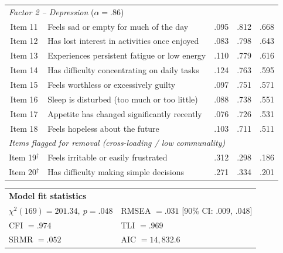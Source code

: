 \documentclass[12pt, a4paper]{article}
\begin{document}
\begin{table}[ht]
\begin{tabular}{clccc}
\multicolumn{5}{l}{\textit{Factor 2 -- Depression} ($\alpha = .86$)} \\[3pt]
\rowcolor{factor2col} Item 11 & Feels sad or empty for much of the day         & .095 & .812 & .668 \\
\rowcolor{factor2col} Item 12 & Has lost interest in activities once enjoyed   & .083 & .798 & .643 \\
\rowcolor{factor2col} Item 13 & Experiences persistent fatigue or low energy   & .110 & .779 & .616 \\
\rowcolor{factor2col} Item 14 & Has difficulty concentrating on daily tasks    & .124 & .763 & .595 \\
\rowcolor{factor2col} Item 15 & Feels worthless or excessively guilty          & .097 & .751 & .571 \\
\rowcolor{factor2col} Item 16 & Sleep is disturbed (too much or too little)    & .088 & .738 & .551 \\
\rowcolor{factor2col} Item 17 & Appetite has changed significantly recently    & .076 & .726 & .531 \\
\rowcolor{factor2col} Item 18 & Feels hopeless about the future                & .103 & .711 & .511 \\[6pt]

\multicolumn{5}{l}{\textit{Items flagged for removal (cross-loading / low communality)}} \\[3pt]
\rowcolor{poorload} Item 19$^{\dagger}$ & Feels irritable or easily frustrated   & .312 & .298 & .186 \\
\rowcolor{poorload} Item 20$^{\dagger}$ & Has difficulty making simple decisions  & .271 & .334 & .201 \\

\bottomrule
\end{tabular}

\vspace{8pt}

\begin{tabular}{ll}
\multicolumn{2}{l}{\textbf{Model fit statistics}} \\[3pt]
$\chi^2(169) = 201.34,\ p = .048$ & RMSEA $= .031$ [90\% CI: .009, .048] \\
CFI $= .974$                       & TLI $= .969$                          \\
SRMR $= .052$                      & AIC $= 14{,}832.6$                    \\
\end{tabular}

\vspace{8pt}


\end{table}
\end{document}
